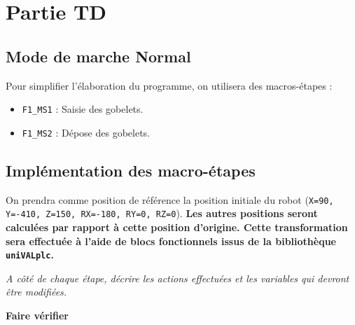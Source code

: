 \section{Partie TD}
\subsection{Mode de marche Normal}
Pour simplifier l'élaboration du programme, on utilisera des macros-étapes : 
\begin{itemize}
    \item \texttt{F1\_MS1} : Saisie des gobelets.
    \item \texttt{F1\_MS2} : Dépose des gobelets.
\end{itemize}
\begin{UPSTIPreparation}
	\vspace{17cm}
\end{UPSTIPreparation}



\subsection{Implémentation des macro-étapes}
On prendra comme position de référence la position initiale du robot (\texttt{X=90, Y=-410, Z=150, RX=-180, RY=0, RZ=0}). \textbf{Les autres positions seront calculées par rapport à cette position d'origine. Cette transformation sera effectuée à l'aide de blocs fonctionnels issus de la bibliothèque \texttt{uniVALplc}.}

\begin{UPSTIPreparation}
	\vspace{4cm}
\end{UPSTIPreparation}


\begin{UPSTIPreparation}
    
    \textit{A côté de chaque étape, décrire les actions effectuées et les variables qui devront être modifiées.}

	\vspace{11cm}
	\textbf{Faire vérifier}
\end{UPSTIPreparation}

